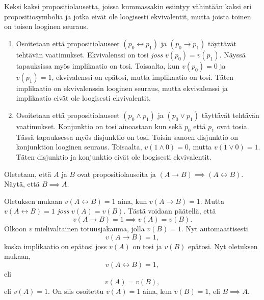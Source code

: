 \documentclass[12pt,a4paper]{article}
\begin{document}
\begin{exercise}
Keksi kaksi propositiolausetta, joissa kummassakin esiintyy vähintään kaksi
eri propositiosymbolia ja jotka eivät ole loogisesti ekvivalentit, mutta
joista toinen on toisen looginen seuraus.
\end{exercise}

\begin{solution}
\leavevmode\par
\begin{enumerate}
\item Osoitetaan että propositiolauseet \((p_0 \leftrightarrow p_1)\) ja
\((p_0 \rightarrow p_1)\) täyttävät tehtävän vaatimukset. Ekvivalenssi on
tosi \emph{joss} \(v(p_0) = v(p_1)\). Näyssä tapauksissa myös implikaatio
on tosi. Toisaalta, kun \(v(p_0) = 0\) ja \(v(p_1) = 1\), ekvivalenssi
on epätosi, mutta implikaatio on tosi. Täten implikaatio on ekvivalenssin
looginen seuraus, mutta ekvivalenssi ja implikaatio eivät ole loogisesti
ekvivalentit.

\item Osoitetaan että propositiolauseet \((p_0 \land p_1)\) ja
\((p_0 \lor p_1)\) täyttävät tehtävän vaatimukset. Konjunktio on tosi
ainoastaan kun sekä \(p_0\) että \(p_1\) ovat tosia. Tässä tapauksessa
myös disjunktio on tosi. Toisin sanoen disjunktio on konjunktion looginen
seuraus. Toisaalta, \(v(1 \land 0) = 0\), mutta
\(v(1 \lor 0) = 1\). Täten disjunktio ja konjunktio eivät ole loogisesti
ekvivalentit.
\end{enumerate}
\end{solution}

\begin{exercise}
Oletetaan, että \(A\) ja \(B\) ovat propositiolauseita ja
\((A \rightarrow B) \implies (A \leftrightarrow B)\).
Näytä, että \(B \implies A\).
\end{exercise}

\begin{solution}
Oletuksen mukaan \(v(A \leftrightarrow B) = 1\) aina, kun
\(v(A \rightarrow B) = 1\). Mutta \(v(A \leftrightarrow B) = 1\) \emph{joss}
\(v(A) = v(B)\). Tästä voidaan päätellä, että
\[
v(A \rightarrow B) = 1 \implies v(A) = v(B).
\]
Olkoon \(v\) mielivaltainen totuusjakauma, jolla \(v(B) = 1\). Nyt
automaattisesti
\[
v(A \rightarrow B) = 1,
\]
koska implikaatio on epätosi joss \(v(A)\) on tosi ja \(v(B)\) epätosi.
Nyt oletuksen mukaan,
\[
v(A \leftrightarrow B) = 1,
\]
eli
\[
v(A) = v(B),
\]
eli \(v(A) = 1\). On siis osoitettu \(v(A) = 1\) aina, kun \(v(B) = 1\),
eli \(B \implies A\).
\end{solution}
\end{document}
